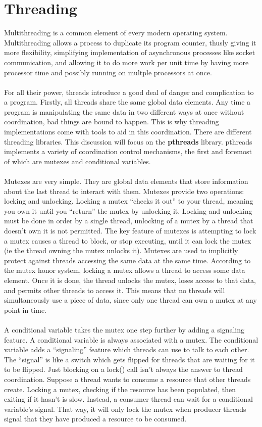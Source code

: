 \documentclass[11pt]{article}
\begin{document}
\section{Threading}
Multithreading is a common element of every modern operating system. Multithreading allows a process to duplicate its program counter, thusly giving it more flexibility, simplifying implementation of asynchronous processes like socket communication, and allowing it to do more work per unit time by having more processor time and possibly running on multple processors at once.\\ \\
For all their power, threads introduce a good deal of danger and complication to a program. Firstly, all threads share the same global data elements. Any time a program is manipulating the same data in two different ways at once without coordination, bad things are bound to happen. This is why threading implementations come with tools to aid in this coordination. There are different threading libraries. This discussion will focus on the \textbf{pthreads} library. pthreads implements a variety of coordination control mechanisms, the first and foremost of which are mutexes and conditional variables.\\ \\
Mutexes are very simple. They are global data elements that store information about the last thread to interact with them. Mutexes provide two operations: locking and unlocking. Locking a mutex ``checks it out'' to your thread, meaning you own it until you ``return'' the mutex by unlocking it. Locking and unlocking must be done in order by a single thread, unlocking of a mutex by a thread that doesn't own it is not permitted. The key feature of mutexes is attempting to lock a mutex causes a thread to block, or stop executing, until it can lock the mutex (ie the thread owning the mutex unlocks it). Mutexes are used to implicitly protect against threads accessing the same data at the same time. According to the mutex honor system, locking a mutex allows a thread to access some data element. Once it is done, the thread unlocks the mutex, loses access to that data, and permits other threads to access it. This means that no threads will simultaneously use a piece of data, since only one thread can own a mutex at any point in time.\\ \\
A conditional variable takes the mutex one step further by adding a signaling feature. A conditional variable is always associated with a mutex. The conditional variable adds a ``signaling'' feature which threads can use to talk to each other. The ``signal'' is like a switch which gets flipped for threads that are waiting for it to be flipped. Just blocking on a lock() call isn't always the answer to thread coordination. Suppose a thread wants to consume a resource that other threads create. Locking a mutex, checking if the resource has been populated, then exiting if it hasn't is slow. Instead, a consumer thread can wait for a conditional variable's signal. That way, it will only lock the mutex when producer threads signal that they have produced a resource to be consumed. \\
\end{document}
